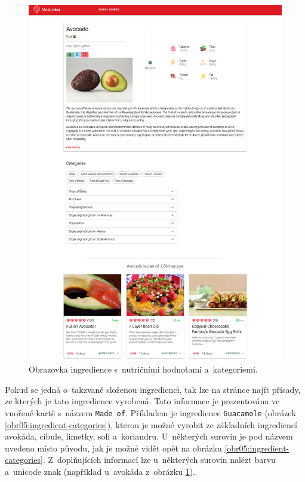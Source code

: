\begin{figure}[p]\centering
\includegraphics[width=140mm]{../img/ingredient-detail}
\caption{Obrazovka ingredience s~nutričními hodnotami a~kategoriemi.}
\label{obr05:ingredient-detail}
\end{figure}

Pokud se jedná o~takzvaně složenou ingredienci, tak lze na stránce najít přísady, ze kterých je tato ingredience vyrobená. Tato informace je prezentována ve vnořené kartě s~názvem \texttt{Made\,of}. Příkladem je ingredience \texttt{Guacamole} (obrázek \ref{obr05:ingredient-categories}), kterou je možné vyrobit ze základních ingrediencí avokáda, cibule, limetky, soli a~koriandru. U~některých surovin je pod názvem uvedeno místo původu, jak je možné vidět opět na obrázku \ref{obr05:ingredient-categories}. Z~doplňujících informací lze u~některých surovin nalézt barvu a~unicode znak (například u~avokáda z~obrázku \ref{obr05:ingredient-detail}).

